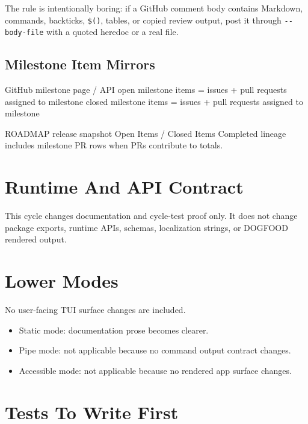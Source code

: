 The rule is intentionally boring: if a GitHub comment body contains Markdown, commands, backticks, \texttt{\$\allowbreak{}(\allowbreak{})}, tables, or copied review output, post it through \texttt{-\allowbreak{}-\allowbreak{}b\allowbreak{}o\allowbreak{}d\allowbreak{}y\allowbreak{}-\allowbreak{}f\allowbreak{}i\allowbreak{}l\allowbreak{}e} with a quoted heredoc or a real file.

\subsection{Milestone Item Mirrors}\label{record-210-milestone-item-mirrors}

\begin{CodeBlock}
GitHub milestone page / API
  open milestone items   = issues + pull requests assigned to milestone
  closed milestone items = issues + pull requests assigned to milestone

ROADMAP release snapshot
  Open Items / Closed Items
  Completed lineage includes milestone PR rows when PRs contribute to totals.
\end{CodeBlock}

\section{Runtime And API Contract}\label{record-210-runtime-and-api-contract}

This cycle changes documentation and cycle-test proof only. It does not change package exports, runtime APIs, schemas, localization strings, or DOGFOOD rendered output.

\section{Lower Modes}\label{record-210-lower-modes}

No user-facing TUI surface changes are included.

\begin{itemize}
\tightlist
\item
  Static mode: documentation prose becomes clearer.
\item
  Pipe mode: not applicable because no command output contract changes.
\item
  Accessible mode: not applicable because no rendered app surface changes.
\end{itemize}

\section{Tests To Write First}\label{record-210-tests-to-write-first}

